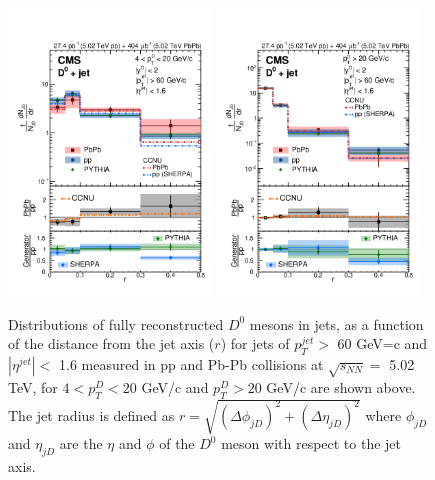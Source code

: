 \begin{figure}[hbtp]
\begin{center}
\includegraphics[width=0.48\textwidth]{Figures/Chapter2/CMSDJetLow.png}
\includegraphics[width=0.48\textwidth]{Figures/Chapter2/CMSDJetHigh.png}
\caption{Distributions of fully reconstructed $D^0$ mesons in jets, as a function of the distance from the jet axis ($r$) for jets of $p_T^{jet} >$ 60 GeV=c and $|\eta^{jet}| <$ 1.6
measured in pp and Pb-Pb collisions at $\sqrt{s_{NN}} = $ 5.02 TeV, for $4 < p_T^D < 20$ GeV/c and $p_T^D > 20$ GeV/c are shown above. The jet radius is defined as $r = \sqrt{(\Delta \phi_{jD})^2 +  (\Delta \eta_{jD})^2 }$ where $\phi_{jD}$ and $\eta_{jD}$ are the $\eta$ and $\phi$ of the $D^0$ meson with respect to the jet axis.}
\label{DJETCorr}
\end{center}
\end{figure}   

